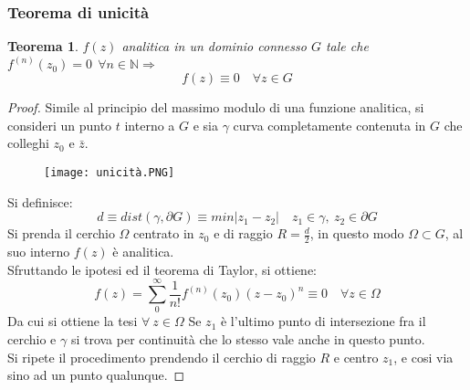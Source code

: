 \documentclass[twoside]{article}
\newtheorem{theorem}{Teorema}[section]
\begin{document}
\subsubsection{Teorema di unicità}
\begin{theorem}\label{8 uni}
$f(z)$ analitica in un dominio connesso $G$ tale che $f^{(n)}(z_0)=0 \ \ \forall n\in \mathds{N}\Longrightarrow$
\begin{equation}
    f(z)\equiv 0 \quad \forall z \in G
\end{equation}
\end{theorem}
\begin{proof}
Simile al principio del massimo modulo di una funzione analitica, si consideri un punto $t$ interno a $G$ e sia $\gamma$ curva completamente contenuta in $G$ che colleghi $z_0$ e $\bar{z}$.\\
\begin{figure}[H]
    \centering
    \texttt{[image: unicità.PNG]}
    \label{unicità}
\end{figure}
Si definisce:
\begin{equation}
    d\equiv dist(\gamma,\partial G)\equiv min |z_1-z_2| \quad z_1\in \gamma,\ z_2 \in \partial G
\end{equation}
Si prenda il cerchio $\Omega$ centrato in $z_0$ e di raggio $R=\frac{d}{2}$, in questo modo $\Omega\subset G$, al suo interno $f(z)$ è analitica.\\
Sfruttando le ipotesi ed il teorema di Taylor, si ottiene:
\begin{equation}
    f(z)=\sum_0^\infty\frac{1}{n!}f^{(n)}(z_0)(z-z_0)^n\equiv0 \quad\forall z\in \Omega
\end{equation}
Da cui si ottiene la tesi $\forall \ z\in \Omega$
Se $z_1$ è l'ultimo punto di intersezione fra il cerchio e $\gamma$ si trova per continuità che lo stesso vale anche in questo punto.\\
Si ripete il procedimento prendendo il cerchio di raggio $R$ e centro $z_1$,  e cosi via sino ad un punto qualunque.

\end{proof}
\end{document}
